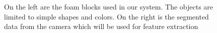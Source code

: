 \documentclass[11pt]{article}
\begin{document}
\begin{figure}
\centering
{}
\caption{On the left are the foam blocks used in our system. The objects are limited to simple shapes and colors. On the right is the segmented data from the camera which will be used for feature extraction}
\label{fig:objects}
\end{figure}
\end{document}
